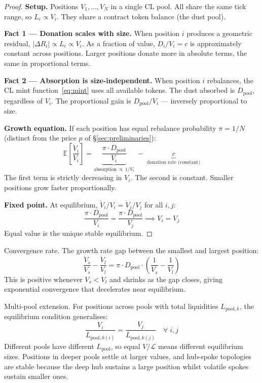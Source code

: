\documentclass[11pt,a4paper]{article}
\begin{document}
\begin{proof}
\textbf{Setup.} Positions $V_1, \ldots, V_N$ in a single CL pool. All share the same tick range, so $L_i \propto V_i$. They share a contract token balance (the dust pool).

\textbf{Fact 1 --- Donation scales with size.} When position $i$ produces a geometric residual, $|\Delta R_i| \propto L_i \propto V_i$. As a fraction of value, $D_i/V_i = c$ is approximately constant across positions. Larger positions donate more in absolute terms, the same in proportional terms.

\textbf{Fact 2 --- Absorption is size-independent.} When position $i$ rebalances, the CL mint function~\eqref{eq:mint} uses all available tokens. The dust absorbed is $D_{\text{pool}}$, regardless of $V_i$. The proportional gain is $D_{\text{pool}}/V_i$ --- inversely proportional to size.

\textbf{Growth equation.} If each position has equal rebalance probability $\pi = 1/N$ (distinct from the price $p$ of \S\ref{sec:preliminaries}):
\begin{equation}\label{eq:growth}
\mathbb{E}\!\left[\frac{\dot{V}_i}{V_i}\right] = \underbrace{\frac{\pi \cdot D_{\text{pool}}}{V_i}}_{\text{absorption}\,\propto\,1/V_i} \;-\; \underbrace{c}_{\text{donation rate (constant)}}
\end{equation}
The first term is strictly decreasing in $V_i$. The second is constant. Smaller positions grow faster proportionally.

\textbf{Fixed point.} At equilibrium, $\dot{V}_i/V_i = \dot{V}_j/V_j$ for all $i, j$:
\begin{equation}\label{eq:fixedpoint}
\frac{\pi \cdot D_{\text{pool}}}{V_i} = \frac{\pi \cdot D_{\text{pool}}}{V_j} \implies V_i = V_j
\end{equation}
Equal value is the unique stable equilibrium.
\end{proof}

Convergence rate. The growth rate gap between the smallest and largest position:
\begin{equation}\label{eq:convergence-rate}
\frac{\dot{V}_s}{V_s} - \frac{\dot{V}_l}{V_l} = \pi \cdot D_{\text{pool}} \cdot \left(\frac{1}{V_s} - \frac{1}{V_l}\right)
\end{equation}
This is positive whenever $V_s < V_l$ and shrinks as the gap closes, giving exponential convergence that decelerates near equilibrium.

Multi-pool extension. For positions across pools with total liquidities $L_{\text{pool},k}$, the equilibrium condition generalises:
\begin{equation}\label{eq:multipool}
\frac{V_i}{L_{\text{pool},k(i)}} = \frac{V_j}{L_{\text{pool},k(j)}} \quad \forall \; i, j
\end{equation}
Different pools have different $L_{\text{pool}}$, so equal $V/\mathcal{L}$ means different equilibrium sizes. Positions in deeper pools settle at larger values, and hub-spoke topologies are stable because the deep hub sustains a large position whilst volatile spokes sustain smaller ones.
\end{document}

